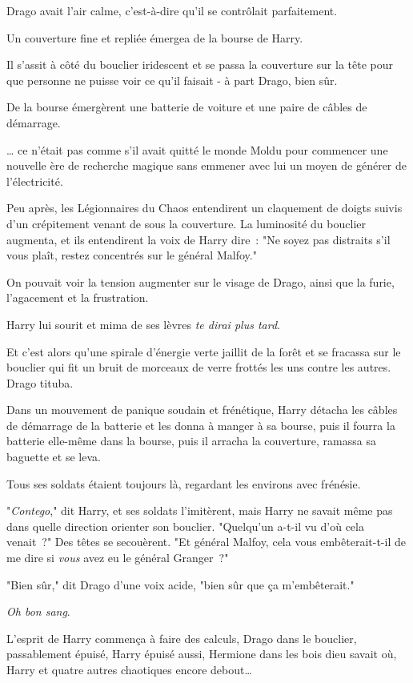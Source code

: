 Drago avait l'air calme, c'est-à-dire qu'il se contrôlait parfaitement.

Un couverture fine et repliée émergea de la bourse de Harry.

Il s'assit à côté du bouclier iridescent et se passa la couverture sur la tête pour que personne ne puisse voir ce qu'il faisait - à part Drago, bien sûr.

De la bourse émergèrent une batterie de voiture et une paire de câbles de démarrage.

… ce n'était pas comme s'il avait quitté le monde Moldu pour commencer une nouvelle ère de recherche magique sans emmener avec lui un moyen de générer de l'électricité.

Peu après, les Légionnaires du Chaos entendirent un claquement de doigts suivis d'un crépitement venant de sous la couverture. La luminosité du bouclier augmenta, et ils entendirent la voix de Harry dire~: "Ne soyez pas distraits s'il vous plaît, restez concentrés sur le général Malfoy."

On pouvait voir la tension augmenter sur le visage de Drago, ainsi que la furie, l'agacement et la frustration.

Harry lui sourit et mima de ses lèvres \emph{te dirai plus tard}.

Et c'est alors qu'une spirale d'énergie verte jaillit de la forêt et se fracassa sur le bouclier qui fit un bruit de morceaux de verre frottés les uns contre les autres. Drago tituba.

Dans un mouvement de panique soudain et frénétique, Harry détacha les câbles de démarrage de la batterie et les donna à manger à sa bourse, puis il fourra la batterie elle-même dans la bourse, puis il arracha la couverture, ramassa sa baguette et se leva.

Tous ses soldats étaient toujours là, regardant les environs avec frénésie.

"\emph{Contego}," dit Harry, et ses soldats l'imitèrent, mais Harry ne savait même pas dans quelle direction orienter son bouclier. "Quelqu'un a-t-il vu d'où cela venait~?" Des têtes se secouèrent. "Et général Malfoy, cela vous embêterait-t-il de me dire si \emph{vous} avez eu le général Granger~?"

"Bien sûr," dit Drago d'une voix acide, "bien sûr que ça m'embêterait."

\emph{Oh bon sang}.

L'esprit de Harry commença à faire des calculs, Drago dans le bouclier, passablement épuisé, Harry épuisé aussi, Hermione dans les bois dieu savait où, Harry et quatre autres chaotiques encore debout…

